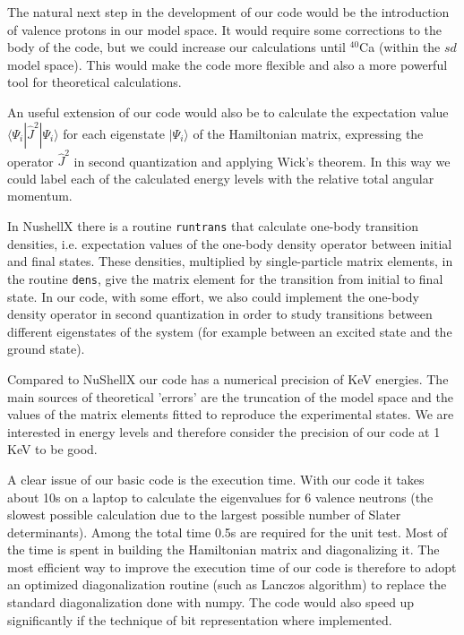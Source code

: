 \documentclass[twoside]{article}
\newcommand{\bra}[1]{\langle #1 |}
\newcommand{\ket}[1]{| #1 \rangle}
\begin{document}
The natural next step in the development of our code would be the introduction of valence protons in our model space. It would require some corrections to the body of the code, but we could increase our calculations until $^{40}$Ca (within the $sd$ model space). This would make the code more flexible and also a more powerful tool for theoretical calculations. 

An useful extension of our code would also be to calculate the expectation value $\bra{\Psi_i} \hat J^2 \ket{\Psi_i}$ for each eigenstate $\ket{\Psi_i}$ of the Hamiltonian matrix, expressing the operator $\hat J^2$ in second quantization and applying Wick's theorem. In this way we could label each of the calculated energy levels with the relative total angular momentum.

In NushellX there is a routine \texttt{runtrans} that calculate one-body transition densities, i.e. expectation values of the one-body density operator between initial and final states. These densities, multiplied by single-particle matrix elements, in the routine \texttt{dens}, give the matrix element for the transition from initial to final state. In our code, with some effort, we also could implement the one-body density operator in second quantization in order to study transitions between different eigenstates of the system (for example between an excited state and the ground state).

Compared to NuShellX our code has a numerical precision of KeV energies. The main sources of theoretical 'errors' are the truncation of the model space and the values of the matrix elements fitted to reproduce the experimental states. We are interested in energy levels and therefore consider the precision of our code at 1 KeV to be good. 

A clear issue of our basic code is the execution time. With our code it takes about 10s on a laptop to calculate the eigenvalues for 6 valence neutrons (the slowest possible calculation due to the largest possible number of Slater determinants). Among the total time 0.5s are required for the unit test. Most of the time is spent in building the Hamiltonian matrix and diagonalizing it. 
The most efficient way to improve the execution time of our code is therefore to adopt an optimized diagonalization routine (such as Lanczos algorithm) to replace the standard diagonalization done with numpy. The code would also speed up significantly if the technique of bit representation where implemented. 
\end{document}
